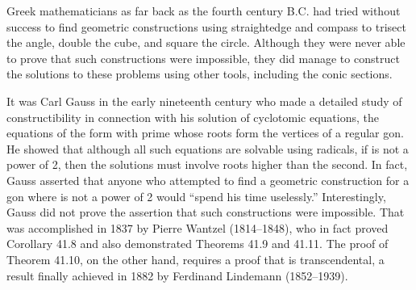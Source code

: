 \documentclass[11pt,oneside]{article}
\begin{document}
\BookNarrativefalse

\begin{BookBody}


Greek mathematicians as far back as the fourth century B.C. had tried without success to find geometric constructions using straightedge and compass to trisect the angle, double the cube, and square the circle. Although they were never able to prove that such constructions were impossible, they did manage to construct the solutions to these problems using other tools, including the conic sections.

It was Carl Gauss in the early nineteenth century who made a detailed study of constructibility in connection with his solution of cyclotomic equations, the equations of the form  with  prime whose roots form the vertices of a regular gon. He showed that although all such equations are solvable using radicals, if  is not a power of 2, then the solutions must involve roots higher than the second. In fact, Gauss asserted that anyone who attempted to find a geometric construction for a gon where  is not a power of 2 would “spend his time uselessly.” Interestingly, Gauss did not prove the assertion that such constructions were impossible. That was accomplished in 1837 by Pierre Wantzel (1814–1848), who in fact proved Corollary 41.8 and also demonstrated Theorems 41.9 and 41.11. The proof of Theorem 41.10, on the other hand, requires a proof that \BookInline{\pi } is transcendental, a result finally achieved in 1882 by Ferdinand Lindemann (1852–1939).

 \BookEnd{\blacksquare}







\end{BookBody}
\end{document}
